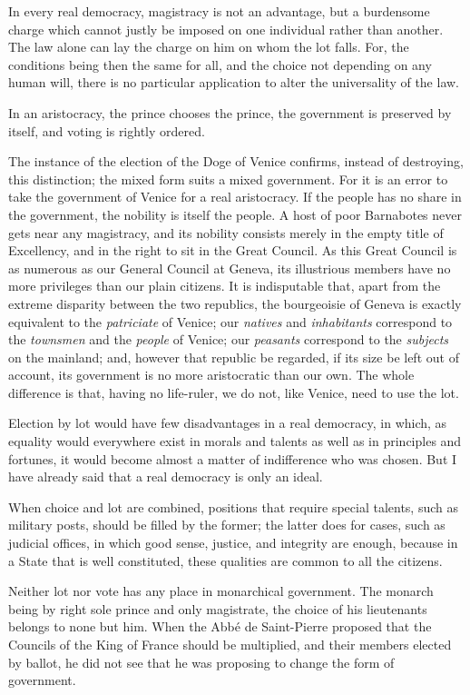 \documentclass[12pt]{report}
\begin{document}
In every real democracy, magistracy is not an advantage, but a burdensome charge which cannot justly be imposed on one individual rather than another. The law alone can lay the charge on him on whom the lot falls. For, the conditions being then the same for all, and the choice not depending on any human will, there is no particular application to alter the universality of the law.

In an aristocracy, the prince chooses the prince, the government is preserved by itself, and voting is rightly ordered.

The instance of the election of the Doge of Venice confirms, instead of destroying, this distinction; the mixed form suits a mixed government. For it is an error to take the government of Venice for a real aristocracy. If the people has no share in the government, the nobility is itself the people. A host of poor Barnabotes never gets near any magistracy, and its nobility consists merely in the empty title of Excellency, and in the right to sit in the Great Council. As this Great Council is as numerous as our General Council at Geneva, its illustrious members have no more privileges than our plain citizens. It is indisputable that, apart from the extreme disparity between the two republics, the bourgeoisie of Geneva is exactly equivalent to the \textit{patriciate} of Venice; our \textit{natives} and \textit{inhabitants} correspond to the \textit{townsmen} and the \textit{people} of Venice; our \textit{peasants} correspond to the \textit{subjects} on the mainland; and, however that republic be regarded, if its size be left out of account, its government is no more aristocratic than our own. The whole difference is that, having no life-ruler, we do not, like Venice, need to use the lot.

Election by lot would have few disadvantages in a real democracy, in which, as equality would everywhere exist in morals and talents as well as in principles and fortunes, it would become almost a matter of indifference who was chosen. But I have already said that a real democracy is only an ideal.

When choice and lot are combined, positions that require special talents, such as military posts, should be filled by the former; the latter does for cases, such as judicial offices, in which good sense, justice, and integrity are enough, because in a State that is well constituted, these qualities are common to all the citizens.

Neither lot nor vote has any place in monarchical government. The monarch being by right sole prince and only magistrate, the choice of his lieutenants belongs to none but him. When the Abb\'{e} de Saint-Pierre proposed that the Councils of the King of France should be multiplied, and their members elected by ballot, he did not see that he was proposing to change the form of government.
\end{document}
